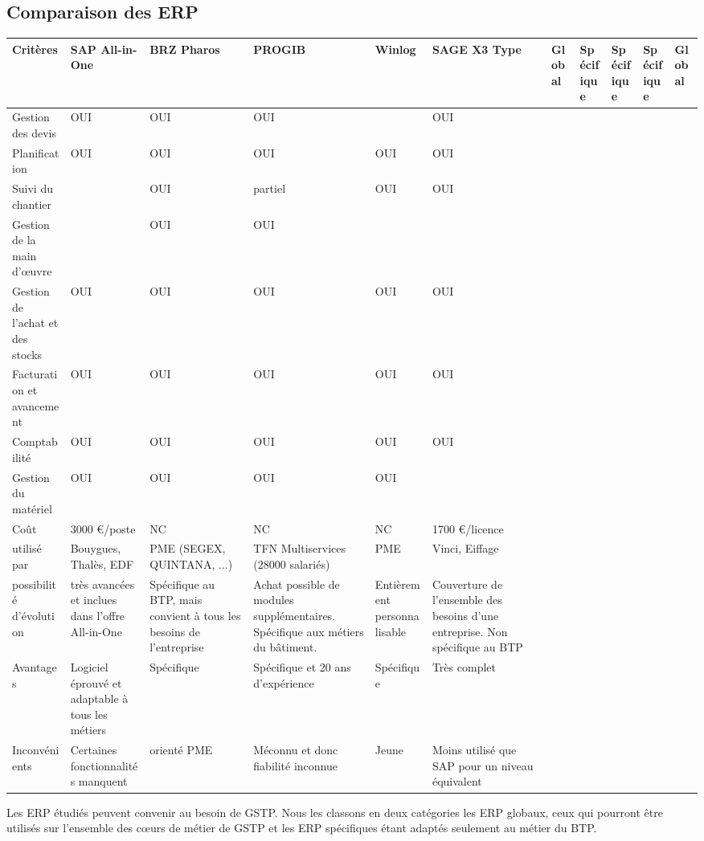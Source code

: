 \pagebreak
\subsection{Comparaison des ERP}

\hskip -15mm
\begin{longtable}{|m{2cm}|m{25mm}|m{25mm}|m{25mm}|m{25mm}|m{25mm}|}
\hline
Critères&SAP All-in-One&BRZ Pharos&PROGIB&Winlog&SAGE X3\endhead
\hline
Type&Global&Spécifique&Spécifique&Spécifique&Global\\
\hline
Gestion des devis&OUI&OUI&OUI&&OUI\\
\hline
Planification &OUI&OUI&OUI&OUI&OUI\\
\hline
Suivi du chantier&&OUI&partiel&OUI&OUI\\
\hline
Gestion de la main d’œuvre&&OUI&OUI&&\\
\hline
Gestion de l’achat et des stocks&OUI&OUI&OUI&OUI&OUI\\
\hline
Facturation et avancement&OUI&OUI&OUI&OUI&OUI\\
\hline
Comptabilité&OUI&OUI&OUI&OUI&OUI\\
\hline
Gestion du matériel&OUI&OUI&OUI&OUI&\\
\hline
Coût&3000 \euro/poste&NC&NC&NC&1700 \euro/licence\\
\hline
utilisé par&Bouygues, Thalès, EDF&PME (SEGEX, QUINTANA, ...)
&TFN Multiservices (28000 salariés)&PME&Vinci, Eiffage\\
\hline
possibilité d'évolution&très avancées et inclues dans l'offre All-in-One
&Spécifique au BTP, mais convient à tous les besoins de l'entreprise
&Achat possible de modules supplémentaires.
Spécifique aux métiers du bâtiment.
&Entièrement personnalisable&Couverture de l'ensemble des besoins
d'une entreprise. Non spécifique au BTP\\
\hline
Avantages&Logiciel éprouvé et adaptable à tous les métiers&Spécifique
&Spécifique et 20 ans d'expérience&Spécifique&Très complet\\
\hline
Inconvénients&Certaines fonctionnalités manquent&orienté PME
&Méconnu et donc fiabilité inconnue&Jeune
&Moins utilisé que SAP pour un niveau équivalent
\\\hline
\end{longtable}
\vskip 10pt

Les ERP étudiés peuvent convenir au besoin de GSTP. Nous les classons en deux
catégories les ERP globaux, ceux qui pourront être utilisés sur l'ensemble des cœurs
de métier de GSTP et les ERP spécifiques étant adaptés seulement au métier du BTP.

\vfill
\pagebreak

